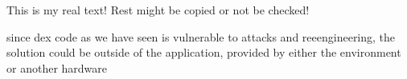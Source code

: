 This is my real text! Rest might be copied or not be checked!

since dex code as we have seen is vulnerable to attacks and reeengineering, the solution could be outside of the application, provided by either the environment or another hardware
